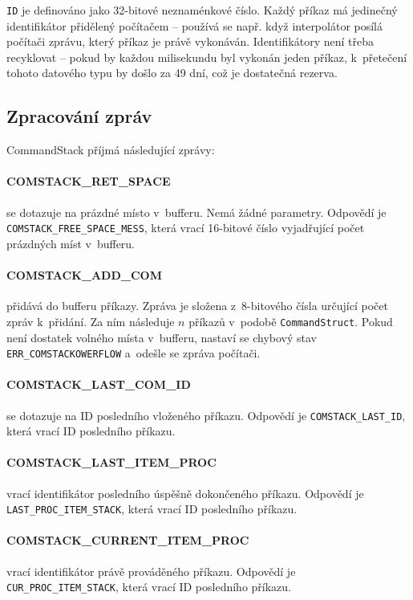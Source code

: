 		{\tt ID} je definováno jako 32-bitové neznaménkové číslo. Každý příkaz má jedinečný identifikátor přidělený počítačem -- používá se např. když interpolátor posílá počítači zprávu, který příkaz je právě vykonáván. Identifikátory není třeba recyklovat -- pokud by každou milisekundu byl vykonán jeden příkaz, k~přetečení tohoto datového typu by došlo za 49 dní, což je dostatečná rezerva.
		
		\subsection{Zpracování zpráv}
		
		CommandStack příjmá následující zprávy:
		
		\paragraph{COMSTACK\_RET\_SPACE}
		 se dotazuje na prázdné místo v~bufferu. Nemá žádné parametry. Odpovědí je {\tt COMSTACK\_FREE\_SPACE\_MESS}, která vrací 16-bitové číslo vyjadřující počet prázdných míst v~bufferu.
		
		\paragraph{COMSTACK\_ADD\_COM}
		 přidává do bufferu příkazy. Zpráva je složena z~8-bitového čísla určující počet zpráv k~přidání. Za ním následuje $n$ příkazů v~podobě {\tt CommandStruct}. Pokud není dostatek volného místa v~bufferu, nastaví se chybový stav {\tt ERR\_COMSTACKOWERFLOW} a~odešle se zpráva počítači.
		 
		\paragraph{COMSTACK\_LAST\_COM\_ID}
		  se dotazuje na ID posledního vloženého příkazu. Odpovědí je {\tt COMSTACK\_LAST\_ID}, která vrací ID posledního příkazu.
		  
		\paragraph{COMSTACK\_LAST\_ITEM\_PROC}
		 vrací identifikátor posledního úspěšně dokončeného příkazu. Odpovědí je {\tt LAST\_PROC\_ITEM\_STACK}, která vrací ID posledního příkazu.	
		 
		\paragraph{COMSTACK\_CURRENT\_ITEM\_PROC}
		 vrací identifikátor právě prováděného příkazu. Odpovědí je {\tt CUR\_PROC\_ITEM\_STACK}, která vrací ID posledního příkazu.	
		  

